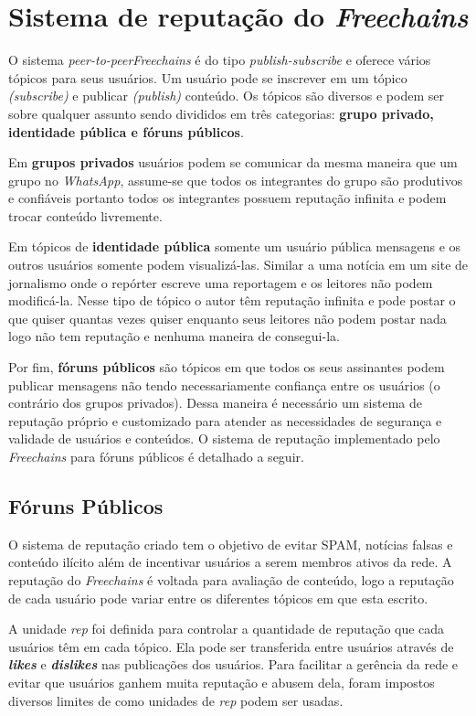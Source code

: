 \documentclass[12pt]{article}
\newcommand{\FC} {\emph{Freechains}\xspace}
\newcommand{\PtoP} {\emph{peer-to-peer}\xspace}
\begin{document}
\section{Sistema de reputação do \FC} \label{sec:freechains}

O sistema \PtoP \FC é do tipo \emph{publish-subscribe} e oferece vários tópicos para seus usuários. Um usuário pode se inscrever em um tópico \emph{(subscribe)} e publicar \emph{(publish)} conteúdo. Os tópicos são diversos e podem ser sobre qualquer assunto sendo divididos 
em três categorias: \textbf{grupo privado, identidade pública e fóruns públicos}. 

Em \textbf{grupos privados} usuários podem se comunicar da mesma maneira que um grupo no \emph{WhatsApp}, assume-se que todos os integrantes do grupo são produtivos e confiáveis portanto todos os integrantes possuem reputação infinita e podem trocar conteúdo livremente.

Em tópicos de \textbf{identidade pública} somente um usuário pública mensagens e os outros usuários somente podem visualizá-las. Similar a uma notícia em um site de jornalismo onde o repórter escreve uma reportagem e os leitores não podem modificá-la. Nesse tipo de tópico o autor têm reputação infinita e pode postar o que quiser quantas vezes quiser enquanto seus leitores não podem postar nada logo não tem reputação e nenhuma maneira de consegui-la.

Por fim, \textbf{fóruns públicos} são tópicos em que todos os seus assinantes podem publicar mensagens não tendo necessariamente confiança entre os usuários (o contrário dos grupos privados). Dessa maneira é necessário um sistema de reputação próprio e customizado para atender as necessidades de segurança e validade de usuários e conteúdos. O sistema de reputação implementado pelo \FC para fóruns públicos é detalhado a seguir.

\subsection{Fóruns Públicos} \label{subsec: forunspub}

O sistema de reputação criado tem o objetivo de evitar SPAM, notícias falsas e conteúdo ilícito além de incentivar usuários a serem membros ativos da rede. A reputação do \FC é voltada para avaliação de conteúdo, logo a reputação de cada usuário pode variar entre os diferentes tópicos em que esta escrito. 

A unidade \emph{rep} foi definida para controlar a quantidade de reputação que cada usuários têm em cada tópico. Ela pode ser transferida entre usuários através de \textbf{\emph{likes}} e \textbf{\emph{dislikes}} nas publicações dos usuários. Para facilitar a gerência da rede e evitar que usuários ganhem muita reputação e abusem dela, foram impostos diversos limites de como unidades de \emph{rep} podem ser usadas. 
\end{document}
